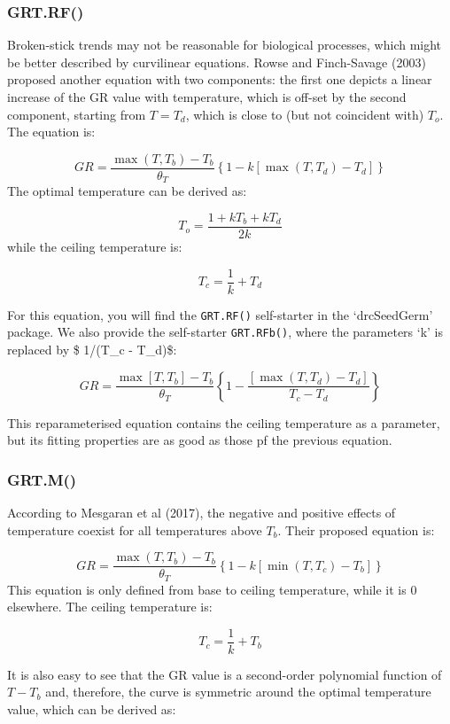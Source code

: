 \documentclass[
]{book}
\begin{document}
\hypertarget{grt.rf}{%
\subsubsection{GRT.RF()}\label{grt.rf}}

Broken-stick trends may not be reasonable for biological processes, which might be better described by curvilinear equations. Rowse and Finch-Savage (2003) proposed another equation with two components: the first one depicts a linear increase of the GR value with temperature, which is off-set by the second component, starting from \(T = T_d\), which is close to (but not coincident with) \(T_o\). The equation is:

\[GR = \frac{ \max \left( T, T_b \right) - T_b}{\theta_{T}} \left\{ 1 - k \left[ \max \left(T,T_d\right) - T_d \right] \right\}\]
The optimal temperature can be derived as:

\[ T_o = \frac{1 + kT_b + kT_d}{2k}\]
while the ceiling temperature is:

\[ T_c = \frac{1}{k} + T_d\]

For this equation, you will find the \texttt{GRT.RF()} self-starter in the `drcSeedGerm' package. We also provide the self-starter \texttt{GRT.RFb()}, where the parameters `k' is replaced by \$ 1/(T\_c - T\_d)\$:

\[GR = \frac{ \max \left[ T, T_b \right] - T_b}{\theta_{T}} \left\{ 1 - \frac{\left[ \max \left(T,T_d\right) - T_d \right]}{T_c - T_d}  \right\}\]

This reparameterised equation contains the ceiling temperature as a parameter, but its fitting properties are as good as those pf the previous equation.

\hypertarget{grt.m}{%
\subsubsection{GRT.M()}\label{grt.m}}

According to Mesgaran et al (2017), the negative and positive effects of temperature coexist for all temperatures above \(T_b\). Their proposed equation is:

\[GR = \frac{ \max \left( T, T_b \right) - T_b}{\theta_{T}} \left\{ 1 - k \left[ \min \left(T,T_c\right) - T_b \right] \right\}\]
This equation is only defined from base to ceiling temperature, while it is 0 elsewhere. The ceiling temperature is:

\[ T_c = \frac{1}{k} + T_b\]

It is also easy to see that the GR value is a second-order polynomial function of \(T - T_b\) and, therefore, the curve is symmetric around the optimal temperature value, which can be derived as:
\end{document}

